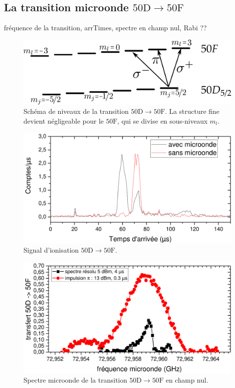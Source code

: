 	\subsection{La transition microonde $\mathrm{50D \rightarrow 50F}$}
		\noindent fréquence de la transition, arrTimes, spectre en champ nul, Rabi ?? \\
\begin{figure}[!h]
\centering
\includegraphics[width=0.7\linewidth]{figures/circulars/levels_50D50F}
\caption[Schéma de niveaux de la transition $\mathrm{50D\rightarrow 50F}$]{
Schéma de niveaux de la transition $\mathrm{50D\rightarrow 50F}$.
La structure fine devient négligeable pour le $\mathrm{50F}$, qui se divise en sous-niveaux $m_l$.
}
\label{fig:levels_50D50F}
\end{figure}

\begin{figure}[!h]
\centering
\includegraphics[width=0.85\linewidth]{figures/circulars/arrTimes_50D-50F}
\caption[Signal d'ionisation $\mathrm{50D\rightarrow 50F}$]{
Signal d'ionisation $\mathrm{50D\rightarrow 50F}$.
}
\label{fig:arrTimes_50D50F}
\end{figure}

\begin{figure}[!h]
\centering
\includegraphics[width=0.85\linewidth]{figures/circulars/spectres_mw_champnul}
\caption[Spectre microonde de la transition $\mathrm{50D\rightarrow 50F}$ en champ nul]{
Spectre microonde de la transition $\mathrm{50D\rightarrow 50F}$ en champ nul.
}
\label{fig:spectres_mw_champnul}
\end{figure}


